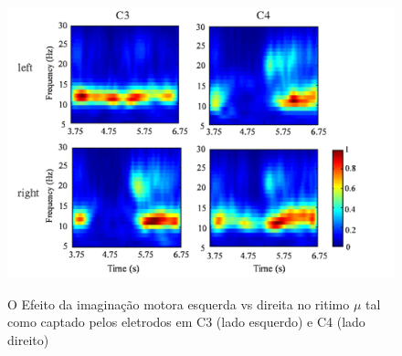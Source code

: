 \begin{figure}[!ht]
	\begin{center}
		\caption{O Efeito da imagina\c{c}\~ao motora esquerda vs direita no ritimo $\mu$ tal como captado pelos eletrodos em C3 (lado esquerdo) e C4 (lado direito) \cite{Qin2004}} 		
		\includegraphics[scale=0.45]{./figuras/mu-left-vs-right}
		\label{fig:mu-left-vs-right}
	\end{center}
\end{figure}
